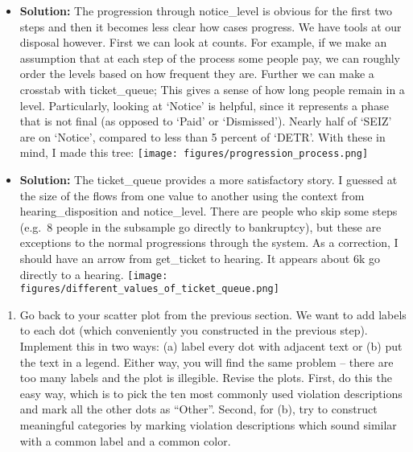 \documentclass[
  letterpaper,
  DIV=11,
  numbers=noendperiod]{scrartcl}
\providecommand{\tightlist}{%
  \setlength{\itemsep}{0pt}\setlength{\parskip}{0pt}}\usepackage{longtable,booktabs,array}
\begin{document}
\begin{itemize}
\item
  \textbf{Solution:} The progression through notice\_level is obvious
  for the first two steps and then it becomes less clear how cases
  progress. We have tools at our disposal however. First we can look at
  counts. For example, if we make an assumption that at each step of the
  process some people pay, we can roughly order the levels based on how
  frequent they are. Further we can make a crosstab with ticket\_queue;
  This gives a sense of how long people remain in a level. Particularly,
  looking at `Notice' is helpful, since it represents a phase that is
  not final (as opposed to `Paid' or `Dismissed'). Nearly half of `SEIZ'
  are on `Notice', compared to less than 5 percent of `DETR'. With these
  in mind, I made this tree:
  \texttt{[image: figures/progression\_process.png]}
\item
  \textbf{Solution:} The ticket\_queue provides a more satisfactory
  story. I guessed at the size of the flows from one value to another
  using the context from hearing\_disposition and notice\_level. There
  are people who skip some steps (e.g.~8 people in the subsample go
  directly to bankruptcy), but these are exceptions to the normal
  progressions through the system. As a correction, I should have an
  arrow from get\_ticket to hearing. It appears about 6k go directly to
  a hearing.
  \texttt{[image: figures/different\_values\_of\_ticket\_queue.png]}
\end{itemize}

\begin{enumerate}
\def\labelenumi{\arabic{enumi}.}
\setcounter{enumi}{5}
\tightlist
\item
  Go back to your scatter plot from the previous section. We want to add
  labels to each dot (which conveniently you constructed in the previous
  step). Implement this in two ways: (a) label every dot with adjacent
  text or (b) put the text in a legend. Either way, you will find the
  same problem -- there are too many labels and the plot is illegible.
  Revise the plots. First, do this the easy way, which is to pick the
  ten most commonly used violation descriptions and mark all the other
  dots as ``Other''. Second, for (b), try to construct meaningful
  categories by marking violation descriptions which sound similar with
  a common label and a common color.
\end{enumerate}
\end{document}
